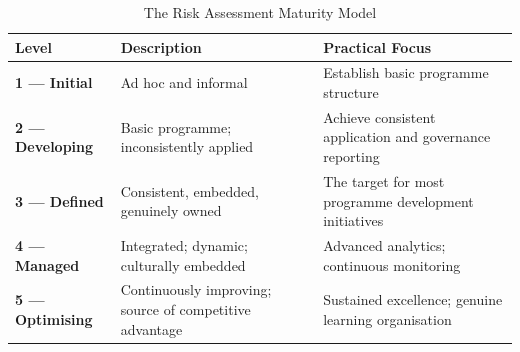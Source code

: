 \begin{table}[H]
  \centering
  \renewcommand{\arraystretch}{1.5}
  \begin{tabularx}{\textwidth}{ | >{\raggedright\arraybackslash}p{} 
								| >{\raggedright\arraybackslash}p{} 
                                | >{\raggedright\arraybackslash}X | }
    \hline
    \textbf{Level} & \textbf{Description} & \textbf{Practical Focus} \\
    \hline
    \textbf{1 — Initial} & Ad hoc and informal & Establish basic programme structure\\
    \hline
    \textbf{2 — Developing} & Basic programme; inconsistently applied & Achieve consistent application and governance reporting\\
    \hline
    \textbf{3 — Defined} & Consistent, embedded, genuinely owned & The target for most programme development initiatives\\
    \hline
    \textbf{4 — Managed} & Integrated; dynamic; culturally embedded & Advanced analytics; continuous monitoring\\
    \hline
    \textbf{5 — Optimising} & Continuously improving; source of competitive advantage & Sustained excellence; genuine learning organisation\\
    \hline
  \end{tabularx}
  \caption{The Risk Assessment Maturity Model}
\end{table}

